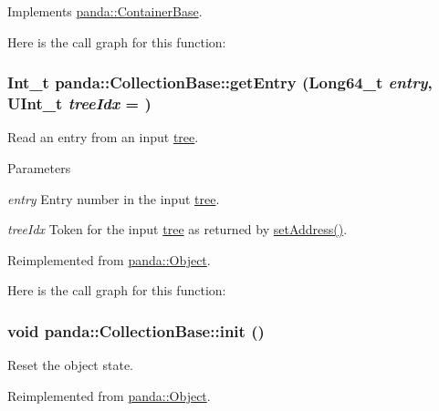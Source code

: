 Implements \hyperlink{classpanda_1_1ContainerBase_aaae758928771e25de7c62db2fc9de750}{panda::ContainerBase}.

Here is the call graph for this function:\hypertarget{classpanda_1_1CollectionBase_a777e26ce2cc4f86e7cc4eb345b0a78d7}{
\subsubsection[{getEntry}]{\setlength{\rightskip}{0pt plus 5cm}Int\_\-t panda::CollectionBase::getEntry (Long64\_\-t {\em entry}, \/  UInt\_\-t {\em treeIdx} = {})}}
\label{classpanda_1_1CollectionBase_a777e26ce2cc4f86e7cc4eb345b0a78d7}


Read an entry from an input \hyperlink{namespacepanda_1_1tree}{tree}. 
\begin{DoxyParams}{Parameters}
\item[{\em entry}]Entry number in the input \hyperlink{namespacepanda_1_1tree}{tree}. \item[{\em treeIdx}]Token for the input \hyperlink{namespacepanda_1_1tree}{tree} as returned by \hyperlink{classpanda_1_1ContainerBase_ad5fdf0c76a93e2c5ae563ad34b268e43}{setAddress()}. \end{DoxyParams}


Reimplemented from \hyperlink{classpanda_1_1Object_a08f9b3d452bc056cf3a285dfad15e5ac}{panda::Object}.

Here is the call graph for this function:\hypertarget{classpanda_1_1CollectionBase_acf4c92c41e6efccc8833981c8e8725c1}{
\subsubsection[{init}]{\setlength{\rightskip}{0pt plus 5cm}void panda::CollectionBase::init ()}}
\label{classpanda_1_1CollectionBase_acf4c92c41e6efccc8833981c8e8725c1}


Reset the object state. 

Reimplemented from \hyperlink{classpanda_1_1Object_a204960e5f165a28176f9b4a42b9ea90c}{panda::Object}.

